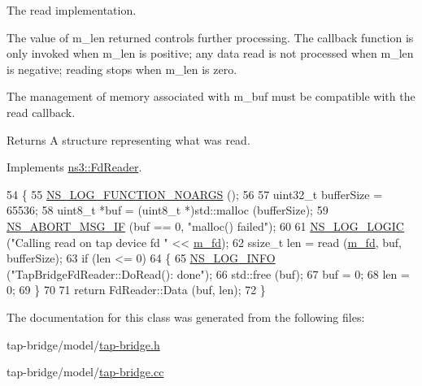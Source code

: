 The read implementation. 

The value of {\ttfamily m\+\_\+len} returned controls further processing. The callback function is only invoked when {\ttfamily m\+\_\+len} is positive; any data read is not processed when {\ttfamily m\+\_\+len} is negative; reading stops when {\ttfamily m\+\_\+len} is zero.

The management of memory associated with {\ttfamily m\+\_\+buf} must be compatible with the read callback.

\begin{DoxyReturn}{Returns}
A structure representing what was read. 
\end{DoxyReturn}


Implements \hyperlink{classns3_1_1FdReader_a5d622d726859828ba7bc557b57689b1b}{ns3\+::\+Fd\+Reader}.


\begin{DoxyCode}
54 \{
55   \hyperlink{log-macros-disabled_8h_a8f7e4afc291c9d29a65c18ac1f79197b}{NS\_LOG\_FUNCTION\_NOARGS} ();
56 
57   uint32\_t bufferSize = 65536;
58   uint8\_t *buf = (uint8\_t *)std::malloc (bufferSize);
59   \hyperlink{group__fatal_ga6653324225bc139e46deea177614ceee}{NS\_ABORT\_MSG\_IF} (buf == 0, \textcolor{stringliteral}{"malloc() failed"});
60 
61   \hyperlink{group__logging_ga88acd260151caf2db9c0fc84997f45ce}{NS\_LOG\_LOGIC} (\textcolor{stringliteral}{"Calling read on tap device fd "} << \hyperlink{classns3_1_1FdReader_ad0883be1c0ebac30885c17c0cc17076d}{m\_fd});
62   ssize\_t len = read (\hyperlink{classns3_1_1FdReader_ad0883be1c0ebac30885c17c0cc17076d}{m\_fd}, buf, bufferSize);
63   \textcolor{keywordflow}{if} (len <= 0)
64     \{
65       \hyperlink{group__logging_gafbd73ee2cf9f26b319f49086d8e860fb}{NS\_LOG\_INFO} (\textcolor{stringliteral}{"TapBridgeFdReader::DoRead(): done"});
66       std::free (buf);
67       buf = 0;
68       len = 0;
69     \}
70 
71   \textcolor{keywordflow}{return} FdReader::Data (buf, len);
72 \}
\end{DoxyCode}


The documentation for this class was generated from the following files\+:\begin{DoxyCompactItemize}
\item 
tap-\/bridge/model/\hyperlink{tap-bridge_8h}{tap-\/bridge.\+h}\item 
tap-\/bridge/model/\hyperlink{tap-bridge_8cc}{tap-\/bridge.\+cc}\end{DoxyCompactItemize}
